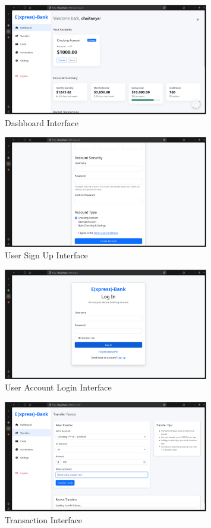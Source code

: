 \begin{figure}[h]
  \centering
  \includegraphics[width=0.8\textwidth]{express_assets/dashboard.png}
  \caption{Dashboard Interface}
\end{figure}

\begin{figure}[h]
  \centering
  \includegraphics[width=0.8\textwidth]{express_assets/register.png}
  \caption{User Sign Up Interface}
\end{figure}

\begin{figure}[h]
  \centering
  \includegraphics[width=0.8\textwidth]{express_assets/login.png}
  \caption{User Account Login Interface}
\end{figure}

\begin{figure}[h]
  \centering
  \includegraphics[width=0.8\textwidth]{express_assets/transfers.png}
  \caption{Transaction Interface}
\end{figure}

